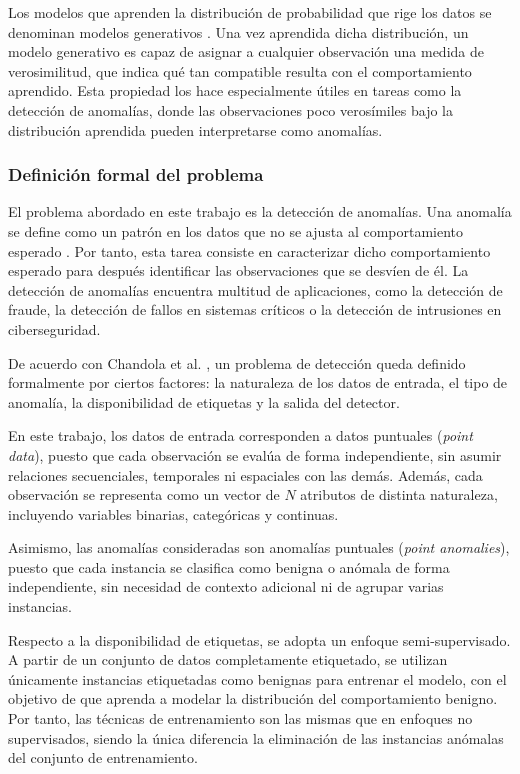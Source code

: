 \documentclass[12pt]{extarticle}
\numberwithin{equation}{section}
\begin{document}
\begin{refsection}
Los modelos que aprenden la distribución de probabilidad que rige los datos se denominan modelos generativos \cite{bishop2006pattern}. Una vez aprendida dicha distribución, un modelo generativo es capaz de asignar a cualquier observación una medida de verosimilitud, que indica qué tan compatible resulta con el comportamiento aprendido. Esta propiedad los hace especialmente útiles en tareas como la detección de anomalías, donde las observaciones poco verosímiles bajo la distribución aprendida pueden interpretarse como anomalías.

\subsubsection{Definición formal del problema}
\label{subsubsec:definicionformalproblema}

El problema abordado en este trabajo es la detección de anomalías. Una anomalía se define como un patrón en los datos que no se ajusta al comportamiento esperado \cite{chandola2009anomaly}. Por tanto, esta tarea consiste en caracterizar dicho comportamiento esperado para después identificar las observaciones que se desvíen de él. La detección de anomalías encuentra multitud de aplicaciones, como la detección de fraude, la detección de fallos en sistemas críticos o la detección de intrusiones en ciberseguridad.

De acuerdo con Chandola et al. \cite{chandola2009anomaly}, un problema de detección queda definido formalmente por ciertos factores: la naturaleza de los datos de entrada, el tipo de anomalía, la disponibilidad de etiquetas y la salida del detector.

En este trabajo, los datos de entrada corresponden a datos puntuales (\textit{point data}), puesto que cada observación se evalúa de forma independiente, sin asumir relaciones secuenciales, temporales ni espaciales con las demás. Además, cada observación se representa como un vector de $N$ atributos de distinta naturaleza, incluyendo variables binarias, categóricas y continuas.

Asimismo, las anomalías consideradas son anomalías puntuales (\textit{point anomalies}), puesto que cada instancia se clasifica como benigna o anómala de forma independiente, sin necesidad de contexto adicional ni de agrupar varias instancias.

Respecto a la disponibilidad de etiquetas, se adopta un enfoque semi-supervisado. A partir de un conjunto de datos completamente etiquetado, se utilizan únicamente instancias etiquetadas como benignas para entrenar el modelo, con el objetivo de que aprenda a modelar la distribución del comportamiento benigno. Por tanto, las técnicas de entrenamiento son las mismas que en enfoques no supervisados, siendo la única diferencia la eliminación de las instancias anómalas del conjunto de entrenamiento.


\end{refsection}
\end{document}
